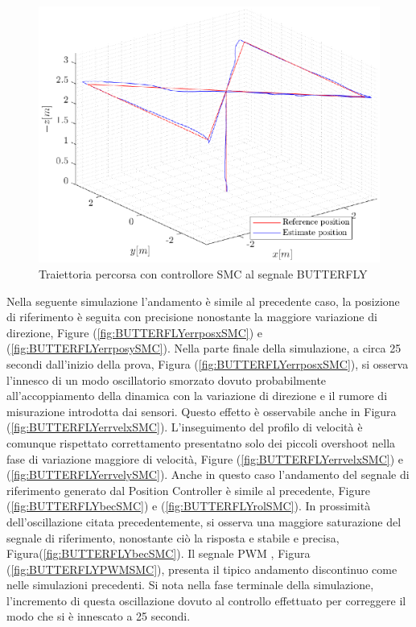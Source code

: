 \begin{figure}
	\centering
	\includegraphics[width=1\textwidth]{Simulazioni/Figure/SMC/BUTTERFLY/Trajectory}
	\caption{Traiettoria percorsa con controllore SMC al segnale BUTTERFLY}
	\label{fig:BUTTERFLYtraSMC}
\end{figure}

Nella seguente simulazione l'andamento è simile al precedente caso, la posizione di riferimento è seguita con precisione nonostante la maggiore variazione di direzione, Figure (\ref{fig:BUTTERFLYerrposxSMC}) e (\ref{fig:BUTTERFLYerrposySMC}). Nella parte finale della simulazione, a circa 25 secondi dall'inizio della prova, Figura (\ref{fig:BUTTERFLYerrposxSMC}), si  osserva l'innesco di un modo oscillatorio smorzato dovuto probabilmente all'accoppiamento della dinamica con la variazione di direzione e il rumore di misurazione introdotta dai sensori. Questo effetto è osservabile anche in Figura (\ref{fig:BUTTERFLYerrvelxSMC}). L'inseguimento del profilo di velocità è comunque rispettato correttamento presentatno solo dei piccoli overshoot nella fase di variazione maggiore di velocità, Figure (\ref{fig:BUTTERFLYerrvelxSMC}) e (\ref{fig:BUTTERFLYerrvelySMC}). Anche in questo caso l'andamento del segnale di riferimento generato dal Position Controller è simile al precedente, Figure (\ref{fig:BUTTERFLYbecSMC}) e (\ref{fig:BUTTERFLYrolSMC}). In prossimità dell'oscillazione citata precedentemente, si osserva una maggiore saturazione del segnale di riferimento, nonostante ciò la risposta e stabile e precisa, Figura(\ref{fig:BUTTERFLYbecSMC}). Il segnale PWM , Figura (\ref{fig:BUTTERFLYPWMSMC}), presenta il tipico andamento discontinuo come nelle simulazioni precedenti. Si nota nella fase terminale della simulazione, l'incremento di questa oscillazione dovuto al controllo effettuato per correggere il modo che si è innescato a 25 secondi.

